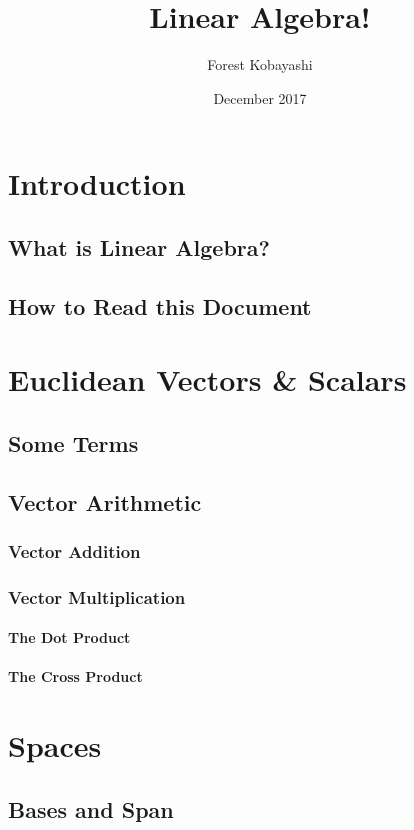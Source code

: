 \documentclass[cm, 10pt, titlepage, oneside]{book}
\title{\bf Linear Algebra!}
\date{December 2017}
\author{Forest Kobayashi}
\begin{document}

\frontmatter
\maketitle
\tableofcontents
\mainmatter


\chapter{Introduction}
  \section{What is Linear Algebra?}
  \section{How to Read this Document}

\chapter{Euclidean Vectors \& Scalars}
  \section{Some Terms}
  \section{Vector Arithmetic}
    \subsection{Vector Addition}
    \subsection{Vector Multiplication}
      \subsubsection{The Dot Product}
      \subsubsection{The Cross Product}

\chapter{Spaces}
  \section{Bases and Span}
\end{document}
